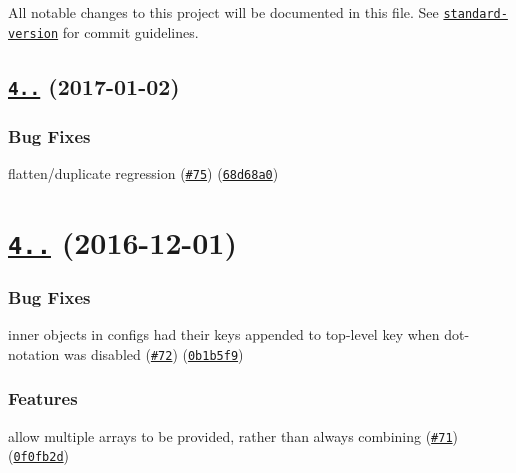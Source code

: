 All notable changes to this project will be documented in this file. See \href{https://github.com/conventional-changelog/standard-version}{\tt standard-\/version} for commit guidelines.

\label{_4.2.1}%
 \subsection*{\href{https://github.com/yargs/yargs-parser/compare/v4.2.0...v4.2.1}{\tt 4..} (2017-\/01-\/02)}

\subsubsection*{Bug Fixes}


\begin{DoxyItemize}
\item flatten/duplicate regression (\href{https://github.com/yargs/yargs-parser/issues/75}{\tt \#75}) (\href{https://github.com/yargs/yargs-parser/commit/68d68a0}{\tt 68d68a0})
\end{DoxyItemize}

\label{_4.2.0}%
 \section*{\href{https://github.com/yargs/yargs-parser/compare/v4.1.0...v4.2.0}{\tt 4..} (2016-\/12-\/01)}

\subsubsection*{Bug Fixes}


\begin{DoxyItemize}
\item inner objects in configs had their keys appended to top-\/level key when dot-\/notation was disabled (\href{https://github.com/yargs/yargs-parser/issues/72}{\tt \#72}) (\href{https://github.com/yargs/yargs-parser/commit/0b1b5f9}{\tt 0b1b5f9})
\end{DoxyItemize}

\subsubsection*{Features}


\begin{DoxyItemize}
\item allow multiple arrays to be provided, rather than always combining (\href{https://github.com/yargs/yargs-parser/issues/71}{\tt \#71}) (\href{https://github.com/yargs/yargs-parser/commit/0f0fb2d}{\tt 0f0fb2d})
\end{DoxyItemize}

